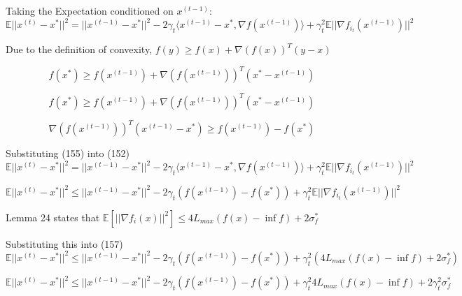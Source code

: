 \noindent Taking the Expectation conditioned on $x^{(t - 1)}$:
\begin{equation}
    \mathbb{E}||x^{(t)} - x^*||^2 = ||x^{(t - 1)} - x^*||^2 - 2\gamma_t \langle x^{(t - 1)} - x^*,  \nabla f(x^{(t - 1)})\rangle + \gamma_t^2 \mathbb{E}||\nabla f_{i_t}(x^{(t - 1)})||^2
\end{equation}


\noindent Due to the definition of convexity, $f(y) \geq f(x) + \nabla(f(x))^T (y - x)$ 

\begin{equation}
    f(x^*) \geq f(x^{(t - 1)}) + \nabla(f(x^{(t - 1)}))^T (x^* - x^{(t - 1)})
\end{equation}

\begin{equation}
    f(x^*) \geq f(x^{(t - 1)}) + \nabla(f(x^{(t - 1)}))^T (x^* - x^{(t - 1)})
\end{equation}

\begin{equation}
    \nabla(f(x^{(t - 1)}))^T (x^{(t - 1)} - x^*) \geq f(x^{(t - 1)}) - f(x^*)
\end{equation}

\noindent Substituting (155) into (152) 
\begin{equation}
    \mathbb{E}||x^{(t)} - x^*||^2 = ||x^{(t - 1)} - x^*||^2 - 2\gamma_t \langle x^{(t - 1)} - x^*,  \nabla f(x^{(t - 1)})\rangle + \gamma_t^2 \mathbb{E}||\nabla f_{i_t}(x^{(t - 1)})||^2
\end{equation}

\begin{equation}
    \mathbb{E}||x^{(t)} - x^*||^2 \leq ||x^{(t - 1)} - x^*||^2 - 2\gamma_t (f(x^{(t - 1)}) - f(x^*)) + \gamma_t^2 \mathbb{E}||\nabla f_{i_t}(x^{(t - 1)})||^2
\end{equation}


\noindent Lemma 24 states that $\mathbb{E}[||\nabla f_i(x)||^2] \leq 4L_{max} (f(x) - \inf f) + 2 \sigma_f^*$ 

\noindent Substituting this into (157)
\begin{equation}
    \mathbb{E}||x^{(t)} - x^*||^2 \leq ||x^{(t - 1)} - x^*||^2 - 2\gamma_t (f(x^{(t - 1)}) - f(x^*)) + \gamma_t^2 (4L_{max} (f(x) - \inf f) + 2 \sigma_f^*) 
\end{equation}

\begin{equation}
    \mathbb{E}||x^{(t)} - x^*||^2 \leq ||x^{(t - 1)} - x^*||^2 - 2\gamma_t (f(x^{(t - 1)}) - f(x^*)) + \gamma_t^2 4L_{max} (f(x) - \inf f) + 2\gamma_t^2 \sigma_f^*
\end{equation}

